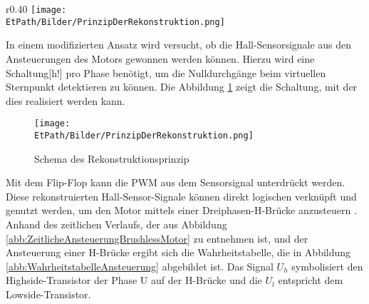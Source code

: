         \ifEMBED
        \begin{wrapfigure}{r}{0.40\textwidth}
            \texttt{[image: \\EtPath/Bilder/PrinzipDerRekonstruktion.png]}
            \centering
            \caption[Schema des Rekonstruktionsprinzip]{Schema des Rekonstruktionsprinzip \cite{HSLU:Pluess}}
            \label{abb:PrinzipRekonstruktion}
            \end{wrapfigure}
        \fi
        In einem modifizierten Ansatz wird versucht, ob die Hall-Sensorsignale 
        aus den Ansteuerungen des Motors gewonnen werden können. Hierzu wird 
        eine Schaltung[h!] pro Phase benötigt, um die Nulldurchgänge beim 
        virtuellen Sternpunkt detektieren zu können. Die Abbildung 
        \ref{abb:PrinzipRekonstruktion} zeigt die Schaltung, mit der dies 
        realisiert werden kann. 
        \ifSTANDALONE
	\begin{figure}[h!]
            \centering
            \texttt{[image: \\EtPath/Bilder/PrinzipDerRekonstruktion.png]}
           	\caption{Schema des Rekonstruktionsprinzip \protect\cite{HSLU:Pluess}}
            \label{abb:PrinzipRekonstruktion}
        \end{figure}
        \fi
        Mit dem Flip-Flop kann die PWM aus dem 
        Sensorsignal unterdrückt werden. Diese rekonstruierten 
        Hall-Sensor-Signale können direkt logischen verknüpft und genutzt 
        werden, um den Motor mittels einer Dreiphasen-H-Brücke anzusteuern 
        \cite{HSLU:Pluess}. Anhand des zeitlichen Verlaufs, der aus Abbildung 
        \ref{abb:ZeitlicheAnsteuerungBrushlessMotor} zu entnehmen ist, und der 
        Ansteuerung einer H-Brücke ergibt sich die Wahrheitstabelle, die in 
        Abbildung \ref{abb:WahrheitstabelleAnsteuerung} abgebildet ist. Das 
        Signal $U_h$ symbolisiert den Highside-Transistor der Phase U auf der 
        H-Brücke und die $U_l$ entspricht dem Lowside-Transistor.\\      
        
